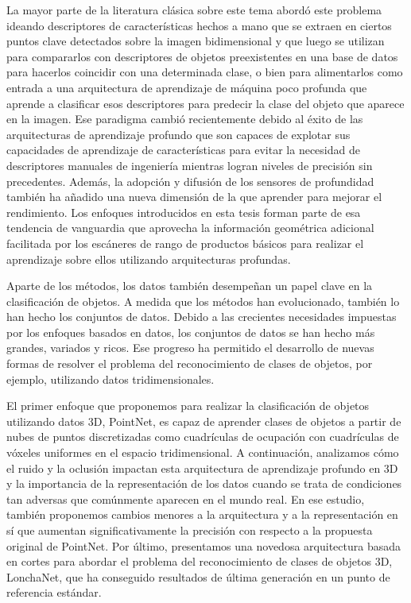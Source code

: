 La mayor parte de la literatura clásica sobre este tema abordó este problema ideando descriptores de características hechos a mano que se extraen en ciertos puntos clave detectados sobre la imagen bidimensional y que luego se utilizan para compararlos con descriptores de objetos preexistentes en una base de datos para hacerlos coincidir con una determinada clase, o bien para alimentarlos como entrada a una arquitectura de aprendizaje de máquina poco profunda que aprende a clasificar esos descriptores para predecir la clase del objeto que aparece en la imagen. Ese paradigma cambió recientemente debido al éxito de las arquitecturas de aprendizaje profundo que son capaces de explotar sus capacidades de aprendizaje de características para evitar la necesidad de descriptores manuales de ingeniería mientras logran niveles de precisión sin precedentes. Además, la adopción y difusión de los sensores de profundidad también ha añadido una nueva dimensión de la que aprender para mejorar el rendimiento. Los enfoques introducidos en esta tesis forman parte de esa tendencia de vanguardia que aprovecha la información geométrica adicional facilitada por los escáneres de rango de productos básicos para realizar el aprendizaje sobre ellos utilizando arquitecturas profundas.

Aparte de los métodos, los datos también desempeñan un papel clave en la clasificación de objetos. A medida que los métodos han evolucionado, también lo han hecho los conjuntos de datos. Debido a las crecientes necesidades impuestas por los enfoques basados en datos, los conjuntos de datos se han hecho más grandes, variados y ricos. Ese progreso ha permitido el desarrollo de nuevas formas de resolver el problema del reconocimiento de clases de objetos, por ejemplo, utilizando datos tridimensionales.

El primer enfoque que proponemos para realizar la clasificación de objetos utilizando datos 3D, PointNet, es capaz de aprender clases de objetos a partir de nubes de puntos discretizadas como cuadrículas de ocupación con cuadrículas de vóxeles uniformes en el espacio tridimensional. A continuación, analizamos cómo el ruido y la oclusión impactan esta arquitectura de aprendizaje profundo en 3D y la importancia de la representación de los datos cuando se trata de condiciones tan adversas que comúnmente aparecen en el mundo real. En ese estudio, también proponemos cambios menores a la arquitectura y a la representación en sí que aumentan significativamente la precisión con respecto a la propuesta original de PointNet. Por último, presentamos una novedosa arquitectura basada en cortes para abordar el problema del reconocimiento de clases de objetos 3D, LonchaNet, que ha conseguido resultados de última generación en un punto de referencia estándar.